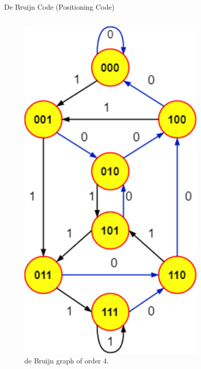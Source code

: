 \begin{frame}{De Bruijn Code (Positioning Code)}
\begin{columns}
        \begin{column}{0.35\textwidth}
            \begin{figure}
                \centering
                \includegraphics[width=0.8\textwidth]{Images/deBruijnOrder4.png}
                \caption{de Bruijn graph of order $4$.}
                \label{fig:dB4}
            \end{figure}
        \end{column}
    \end{columns}
\end{frame}

